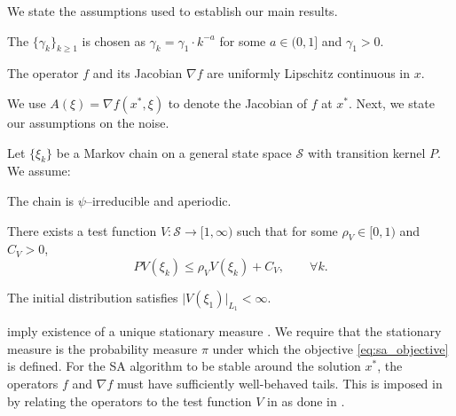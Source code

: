 \documentclass[11pt]{article}
\begin{document}
We state the assumptions used to establish our main results.
\begin{assumption}\label{ass:step_size}
    The \stepsize $\{\gamma_k\}_{k \geq 1}$ is chosen as $\gamma_k = \gamma_1 \cdot k^{-a}$ for some $a \in (0, 1]$ and $\gamma_1 > 0$. 
\end{assumption}
\begin{assumption}\label{ass:jacobian}
    The operator $f$ and its Jacobian $\nabla f$ are uniformly Lipschitz continuous in $x$. 
\end{assumption}
We use $A(\xi) = \nabla f(x^*, \xi)$ to denote the Jacobian of $f$ at $x^*$.
Next, we state our assumptions on the noise.
\begin{assumption}\label{ass:noise_markov}
    Let $\{\xi_k\}$ be a Markov chain on a general state space $\mathcal{S}$ with transition kernel $P$. 
    We assume:
    \begin{assumptionsub}
            \item The chain is $\psi$--irreducible and aperiodic. \label{ass:noise_markov:irreducibility}

        \item There exists a test function $V: \mathcal{S} \to [1, \infty)$ such that for some $\rho_V \in [0, 1)$ and $C_V > 0$, 
    \begin{equation*}
        P V(\xi_k) \leq \rho_V V(\xi_k) + C_V , \qquad \forall k .
    \end{equation*}
    \label{ass:noise_markov:drift}

        \item The initial distribution satisfies $\lvert V(\xi_1) \rvert_{L_{1}} < \infty$.
        \label{ass:noise_markov:initial}

    \end{assumptionsub}    
\end{assumption}
 imply existence of a unique stationary measure \citep[Theorem 15.0.1]{meyn2012markov}. 
We require that the stationary measure is the probability measure $\pi$ under which the objective \eqref{eq:sa_objective} is defined. 
For the SA algorithm to be stable around the solution $x^*$, the operators $f$ and $\nabla f$ must have sufficiently well-behaved tails. 
This is imposed in  by relating the operators to the test function $V$ in  as done in \citep{borkar25}. 
\end{document}
